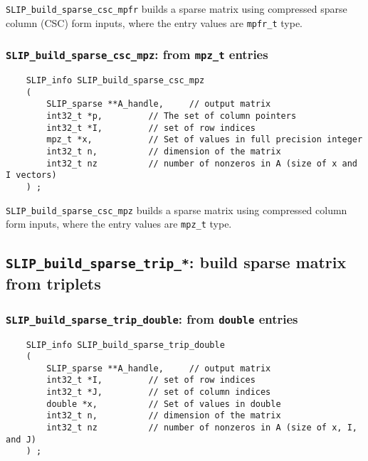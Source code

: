 \documentclass[12pt]{article}
\theoremstyle{definition}
\begin{document}
\verb|SLIP_build_sparse_csc_mpfr| builds a sparse matrix using compressed
sparse column (CSC) form inputs, where the entry values are \verb|mpfr_t| type.

\cprotect\subsubsection{\verb|SLIP_build_sparse_csc_mpz|: from \verb|mpz_t| entries}
\label{s:user:build_sparse_csc_mpz}

\begin{mdframed}[userdefinedwidth=6in]
{\footnotesize
\begin{verbatim}
    SLIP_info SLIP_build_sparse_csc_mpz
    (
        SLIP_sparse **A_handle,     // output matrix
        int32_t *p,         // The set of column pointers
        int32_t *I,         // set of row indices
        mpz_t *x,           // Set of values in full precision integer
        int32_t n,          // dimension of the matrix
        int32_t nz          // number of nonzeros in A (size of x and I vectors)
    ) ;
\end{verbatim}
} \end{mdframed}

\verb|SLIP_build_sparse_csc_mpz| builds a sparse matrix using compressed column
form inputs, where the entry values are \verb|mpz_t| type.

\cprotect\subsection{\verb|SLIP_build_sparse_trip_*|: build sparse matrix
from triplets}

\cprotect\subsubsection{\verb|SLIP_build_sparse_trip_double|:
from \verb|double| entries}
\label{s:user:build_sparse_trip_double}

\begin{mdframed}[userdefinedwidth=6in]
{\footnotesize
\begin{verbatim}
    SLIP_info SLIP_build_sparse_trip_double
    (
        SLIP_sparse **A_handle,     // output matrix
        int32_t *I,         // set of row indices
        int32_t *J,         // set of column indices
        double *x,          // Set of values in double
        int32_t n,          // dimension of the matrix
        int32_t nz          // number of nonzeros in A (size of x, I, and J)
    ) ;
\end{verbatim}
} \end{mdframed}
\end{document}
